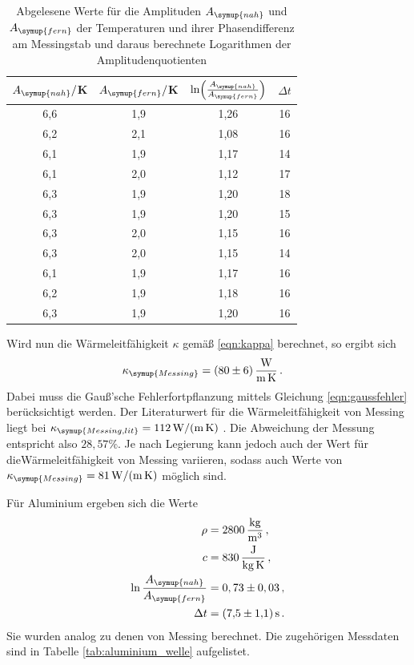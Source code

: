 \begin{table}
  \centering
  \caption{Abgelesene Werte für die Amplituden $A_{\symup{nah}}$ und $A_{\symup{fern}}$ der Temperaturen und
  ihrer Phasendifferenz am Messingstab und daraus berechnete Logarithmen der Amplitudenquotienten}
  \label{tab:messing_welle}
  \begin{tabular}{c c c c}
    \toprule
     $A_{\symup{nah}}/$K  & $A_{\symup{fern}}/$K & $\ln\Bigl(\frac{A_{\symup{nah}}}{A_{\symup{fern}}}\Bigr)$ & $\Delta t$ \\
    \midrule
    6,6 & 1,9 & 1,26  & 16  \\
    6,2 & 2,1 & 1,08  & 16  \\
    6,1 & 1,9 & 1,17  & 14  \\
    6,1 & 2,0 & 1,12  & 17  \\
    6,3 & 1,9 & 1,20  & 18  \\
    6,3 & 1,9 & 1,20  & 15  \\
    6,3 & 2,0 & 1,15  & 16  \\
    6,3 & 2,0 & 1,15  & 14  \\
    6,1 & 1,9 & 1,17  & 16  \\
    6,2 & 1,9 & 1,18  & 16  \\
    6,3 & 1,9 & 1,20  & 16  \\
    \bottomrule
  \end{tabular}
\end{table}

Wird nun die Wärmeleitfähigkeit $\kappa$ gemäß \eqref{eqn:kappa} berechnet, so ergibt sich
\begin{align}
  \kappa_{\symup{Messing}} &= \SI{80(6)}{\watt\per\meter\per\kelvin}\,.\nonumber
\end{align}
Dabei muss die Gauß'sche Fehlerfortpflanzung mittels Gleichung \eqref{eqn:gaussfehler}
berücksichtigt werden.
Der Literaturwert für die Wärmeleitfähigkeit von Messing liegt bei
$\kappa_{\symup{Messing,lit}}=\SI{112}{\watt\per\meter\per\kelvin}$ \cite{Wärmeleitfähigkeit1}.
Die Abweichung der Messung entspricht also $28,57\%$. Je nach Legierung kann
jedoch auch der Wert für dieWärmeleitfähigkeit von Messing variieren, sodass auch Werte von
$\kappa_{\symup{Messing}} = \SI{81}{\watt\per\meter\per\kelvin}$ \cite{Wärmeleitfähigkeit2}
möglich sind.




Für Aluminium ergeben sich die Werte
\begin{align}
  \rho &= \SI{2800}{\kilo\gram\per\cubic\meter}\,, \nonumber\\
  c &= \SI{830}{\joule\per\kilo\gram\per\kelvin}\,, \nonumber\\
  \ln{\frac{A_{\symup{nah}}}{A_{\symup{fern}}}} &= 0,73 \pm 0,03 \,, \nonumber\\
  \Delta t &= \SI{7.5(11)}{\second} \,.\nonumber
\end{align}
Sie wurden analog zu denen von Messing berechnet. Die zugehörigen Messdaten sind
in Tabelle \ref{tab:aluminium_welle} aufgelistet.

